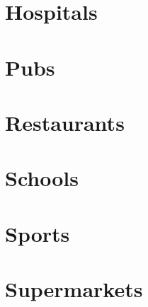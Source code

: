 \section{Hospitals}


\section{Pubs}


\section{Restaurants}


\section{Schools}


\section{Sports}


\section{Supermarkets}



